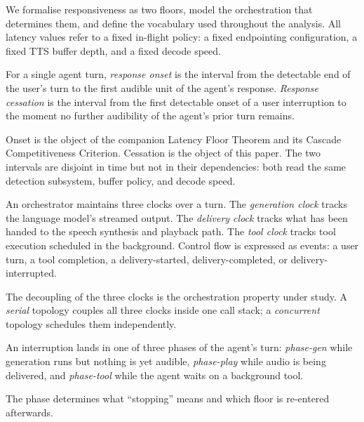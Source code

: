 We formalise responsiveness as two floors, model the orchestration that determines them, and
define the vocabulary used throughout the analysis.
All latency values refer to a fixed in-flight policy: a fixed endpointing configuration, a
fixed TTS buffer depth, and a fixed decode speed.

\begin{definition}
\label{def:floors}
For a single agent turn, \emph{response onset} is the interval from the detectable end of the
user's turn to the first audible unit of the agent's response.
\emph{Response cessation} is the interval from the first detectable onset of a user
interruption to the moment no further audibility of the agent's prior turn remains.
\end{definition}

Onset is the object of the companion Latency Floor Theorem and its Cascade Competitiveness
Criterion.
Cessation is the object of this paper.
The two intervals are disjoint in time but not in their dependencies: both read the same
detection subsystem, buffer policy, and decode speed.

\begin{definition}
\label{def:clocks}
An orchestrator maintains three clocks over a turn.
The \emph{generation clock} tracks the language model's streamed output.
The \emph{delivery clock} tracks what has been handed to the speech synthesis and playback
path.
The \emph{tool clock} tracks tool execution scheduled in the background.
Control flow is expressed as events: a user turn, a tool completion, a delivery-started,
delivery-completed, or delivery-interrupted.
\end{definition}

The decoupling of the three clocks is the orchestration property under study.
A \emph{serial} topology couples all three clocks inside one call stack; a
\emph{concurrent} topology schedules them independently.

\begin{definition}
\label{def:phases}
An interruption lands in one of three phases of the agent's turn:
\emph{phase-gen} while generation runs but nothing is yet audible,
\emph{phase-play} while audio is being delivered, and
\emph{phase-tool} while the agent waits on a background tool.
\end{definition}

The phase determines what ``stopping'' means and which floor is re-entered afterwards.

